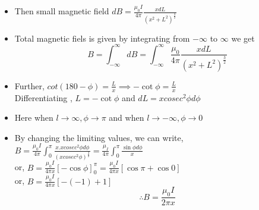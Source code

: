 \documentclass{beamer}
\begin{document}
\begin{frame}
\begin{itemize}
\item Then small magnetic field $dB=\frac{\mu_0 I}{4\pi}\frac{xdL}{(x^2+L^2)^{\frac{3}{2}}}$
\item Total magnetic fiels is given by integrating from $-\infty$ to $\infty$ we get\\

	\begin{equation}
	B=\int_{-\infty}^{\infty}dB=\int_{-\infty}^{\infty} \frac{\mu_0}{4\pi}\frac{xdL}{(x^2+L^2)^{\frac{3}{2}}}
	\end{equation}
	\item Further, $cot(180-\phi)=\frac{L}{x} \implies -\cot\phi=\frac{L}{x}$\\
	Differentiating , $L=-\cot\phi$ and $dL=x cosec^2\phi d\phi$ \\
	
\item Here when $l\rightarrow\infty, \phi\rightarrow \pi$ and when $l\rightarrow -\infty, \phi\rightarrow 0$ 
\item By changing the limiting values, we can write,\\
\hspace{2cm} $B=\frac{\mu_0 I}{4\pi}\int_{0}^{\pi}\frac{x.xcosec^2\phi d\phi}{(x cosec^2\phi)^{\frac{3}{2}}}=\frac{\mu_ I}{4\pi}\int_{0}^{\pi}\frac{\sin\phi d\phi}{x}$\\
or, \hspace{1cm} $B=\frac{\mu_0 I}{4\pi x}[-\cos\phi]_{0}^{\pi}=\frac{\mu_0 I}{4\pi x}[\cos\pi+\cos 0]$\\
or,\hspace{1cm} $B=\frac{\mu_0 I}{4\pi x}[-(-1)+1]$\\
\begin{equation}
\therefore  B=\frac{\mu_0 I}{2\pi x}
\end{equation}

\end{itemize}
\end{frame}
\end{document}
